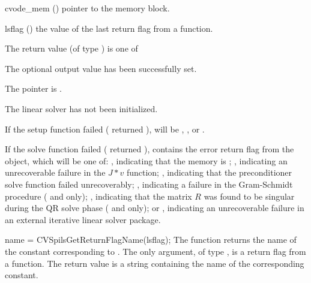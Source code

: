 {
  \begin{args}
  \item[cvode\_mem] ()
    pointer to the {\cvode} memory block.
  \item[lsflag] ()
    the value of the last return flag from a {\cvspils} function.
  \end{args}
}
{
  The return value  (of type ) is one of
  \begin{args}
  \item[\Id{CVSPILS\_SUCCESS}]
    The optional output value has been successfully set.
  \item[\Id{CVSPILS\_MEM\_NULL}]
    The  pointer is .
  \item[\Id{CVSPILS\_LMEM\_NULL}]
    The {\cvspils} linear solver has not been initialized.
  \end{args}
}
{
  If the {\cvspils} setup function failed ( returned
  ),  will be ,
  , or .

  If the {\cvspils} solve function failed ( returned
  ),  contains the error return flag from
  the {\sunlinsol} object, which will be one of:
  , indicating that the {\sunlinsol} memory is ;
  , indicating an unrecoverable failure in the
  $J*v$ function;
  , indicating that the preconditioner solve
  function  failed unrecoverably;
  , indicating a failure in the Gram-Schmidt
  procedure ({\spgmr} and {\spfgmr} only);
  , indicating that the matrix $R$ was found to be
  singular during the QR solve phase ({\spgmr} and {\spfgmr} only); or
  , indicating an unrecoverable
  failure in an external iterative linear solver package.
}
{
  name = CVSpilsGetReturnFlagName(lsflag);
}
{
  The function  returns the
  name of the {\cvspils} constant corresponding to .
}
{
  The only argument, of type , is a return flag from a {\cvspils} function.
}
{
  The return value is a string containing the name of the corresponding constant.
}
{}


